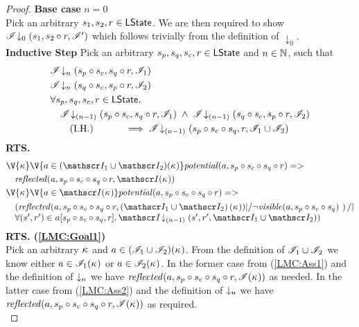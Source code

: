 \begin{lemma}
\begin{proof}
\noindent\textbf{Base case }$n=0$\\
Pick an arbitrary $s_1, s_2, r \in \textsf{LState}$. We are then required to show	$\mathscr{I} \!\downarrow_{0} \left(s_1, s_2 \circ r, \mathscr{I}'\right) $ which follows trivially from the definition of $\downarrow_0$.\\

\noindent\textbf{Inductive Step} Pick an arbitrary $s_p, s_q, s_c, r \in \textsf{LState}$ and $n \in \mathbb{N}$, such that
%
\begin{align}
	& \mathscr{I} \!\downarrow_{n} \left(s_p \circ s_c, s_q \circ r, \mathscr{I}_{1}\right) \label{LMC:Ass1}\\
	& \mathscr{I} \!\downarrow_{n} \left(s_q \circ s_c, s_p \circ r, \mathscr{I}_{2}\right) \label{LMC:Ass2}\\
	& \forall s_p, s_q, s_c, r \in \textsf{LState}.\, \nonumber \\
	&	\quad \mathscr{I} \!\downarrow_{(n-1)} \left(s_p \circ s_c, s_q \circ r, \mathscr{I}_{1}\right) \;\land\; \mathscr{I} \!\downarrow_{(n-1)} \left(s_q \circ s_c, s_p \circ r, \mathscr{I}_{2}\right) \nonumber \\
	&	\tag{I.H.} \qquad\quad\implies  \mathscr{I} \!\downarrow_{(n-1)} \left(s_p \circ s_c \circ s_q, r, \mathscr{I}_{1} \cup \mathscr{I}_{2}\right) \label{LMC:IH}
\end{align}
%
%
\noindent\textbf{RTS.}
%
\begin{align} 
	&\V{\ca{}}\V{a\in (\lmod_1 \cup \lmod_2)(\ca{})}
  \m{potential}(a,s_p \composeL s_c \composeL s_q \composeL r) => \nonumber\\
  &\quad \m{reflected}(a,s_p \composeL s_c \composeL s_q \composeL r, \lmod(\ca{})) \label{LMC:Goal1}\\
  &\V{\ca{}}\V{a\in \lmod(\ca{})}
  \m{potential}(a,s_p \composeL s_c \composeL s_q \composeL r) =>\null \nonumber \\
  &\quad 
	\begin{array}{@{} l @{}}
		\left(\m{reflected}(a,s_p \composeL s_c \composeL s_q \composeL r, \left( \lmod_1 \cup \lmod_2 \right)(\ca{})) |/ \neg\m{visible}(a,s_p \composeL s_c \composeL s_q) \ \right) /| \\
		\for{(s', r') \in a[s_p \composeL s_c \composeL s_q, r]} \extendsAMUpto{\lmod}{(n-1)}{s'}{r'}{\lmod_1 \cup \lmod_2})
	\end{array}	  
	\label{LMC:Goal2}
\end{align}
%
%
%
\noindent\textbf{RTS. (\ref{LMC:Goal1})}\\
Pick an arbitrary $\kappa_{}$ and $a \in (\mathscr{I}_1 \cup \mathscr{I}_2)(\kappa_{})$. From the definition of $\mathscr{I}_1 \cup \mathscr{I}_2$ we know either $a \in \mathscr{I}_1(\kappa_{})$ or $a \in \mathscr{I}_2(\kappa_{})$. In the former case from (\ref{LMC:Ass1}) and the definition of $\downarrow_n$ we have $\mathit{reflected}(a, s_p \circ s_c \circ s_q \circ r, \mathscr{I}(\kappa_{}))$ as needed. In the latter case from (\ref{LMC:Ass2}) and the definition of $\downarrow_n$ we have $\mathit{reflected}(a, s_p \circ s_c \circ s_q \circ r, \mathscr{I}(\kappa_{}))$ as required.\\


\end{proof}
\end{lemma}
